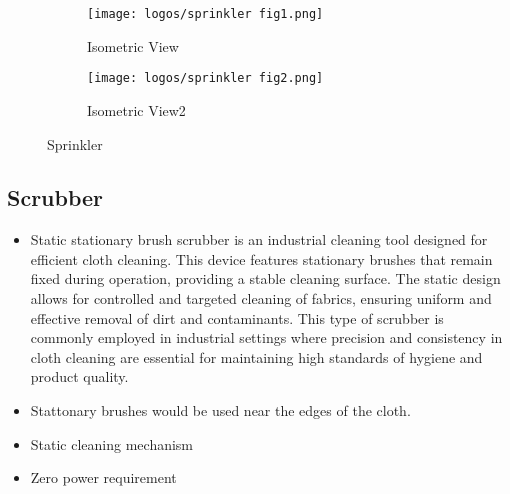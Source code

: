 \documentclass[table]{rapportCS}
\begin{document}
\begin{figure}[h]
    \centering
    \begin{subfigure}{0.4\textwidth}\label{sec:figone}
        \centering
        \texttt{[image: logos/sprinkler fig1.png]}
        \caption{Isometric View}
    \end{subfigure}\hspace{0.1\textwidth}%
    \begin{subfigure}{0.5\textwidth}\label{sec:figtwo}
        \centering
        \texttt{[image: logos/sprinkler fig2.png]}
        \caption{Isometric View2}
    \end{subfigure}
    \caption{Sprinkler}
\end{figure}
\clearpage
\subsection{Scrubber}
\begin{itemize}[label=$\bullet$]
    \item Static stationary brush scrubber is an industrial cleaning tool designed for efficient cloth cleaning. This device features stationary brushes that remain fixed during operation, providing a stable cleaning surface. The static design allows for controlled and targeted cleaning of fabrics, ensuring uniform and effective removal of dirt and contaminants. This type of scrubber is commonly employed in industrial settings where precision and consistency in cloth cleaning are essential for maintaining high standards of hygiene and product quality.
    \item Stattonary brushes would be used near the edges of the cloth.
    \item Static cleaning mechanism
    \item Zero power requirement
    
\end{itemize}

\end{document}
